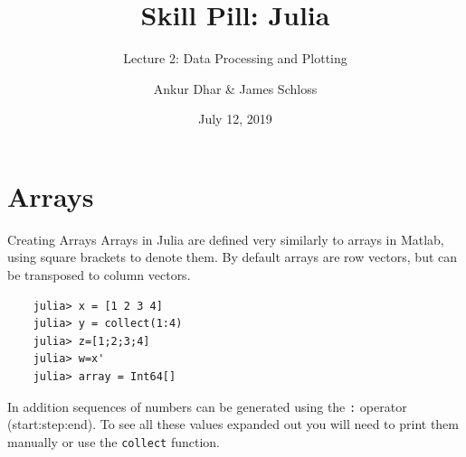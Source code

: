 \documentclass{beamer}
\title[Skill Pill]{Skill Pill: Julia} %
\subtitle{Lecture 2: Data Processing and Plotting}
\author{Ankur Dhar \& James Schloss} %
\institute[OIST] %
{
	\textit{ankurd@oist.jp} \\ %
	\textit{james.schloss@oist.jp} %
}
\date{July 12, 2019} %
\begin{document}

\begin{frame}
\vspace*{1.4cm}
\titlepage %
\end{frame}



\begin{frame}
  \tableofcontents
\end{frame}
\section{Arrays}
\begin{frame}[fragile]{Creating Arrays}
	Arrays in Julia are defined very similarly to arrays in Matlab, using square brackets to denote them. By default arrays are row vectors, but can be transposed to column vectors.
	\begin{lstlisting}
	julia> x = [1 2 3 4]
	julia> y = collect(1:4)
	julia> z=[1;2;3;4]
	julia> w=x'
	julia> array = Int64[]
	\end{lstlisting}
	In addition sequences of numbers can be generated using the \verb|:| operator (start:step:end). To see all these values expanded out you will need to print them manually or use the \verb|collect| function. 
\end{frame}
\end{document}
